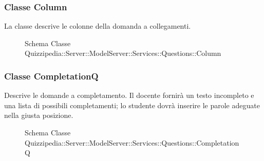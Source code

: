 \subsubsection{Classe Column}
La classe descrive le colonne della domanda a collegamenti.
\begin{figure}[H]
\centering
\noindent{}
\caption{Schema Classe Quizzipedia::Server::ModelServer::Services::Questions::Column}
\end{figure}
\subsubsection{Classe CompletationQ}
Descrive le domande a completamento. Il docente fornirà un testo incompleto e una lista di possibili completamenti; lo studente dovrà inserire le parole adeguate nella giusta posizione.
\begin{figure}[H]
\centering
\noindent{}
\caption{Schema Classe Quizzipedia::Server::ModelServer::Services::Questions::CompletationQ}
\end{figure}
